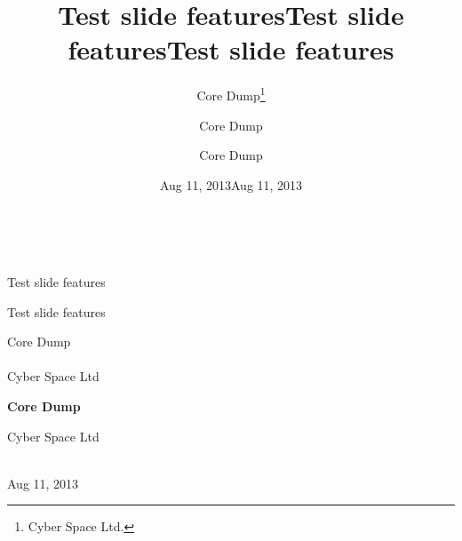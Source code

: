 \documentclass[%
oneside,                 %
final,                   %
chapterprefix=true,      %
open=right               %
10pt]{book}
\begin{document}







\title{Test slide features}


\thispagestyle{empty}
\hbox{\ \ }
\vfill
\begin{center}
{\huge{\bfseries{
\begin{spacing}{1.25}
Test slide features
\end{spacing}
}}}

\title*{Test slide features}

\title{Test slide features}
\begin{center}
{\LARGE\bf
\begin{spacing}{1.25}
Test slide features
\end{spacing}
}
\end{center}

\author{Core Dump\footnote{Cyber Space Ltd.}}

\vspace{1.3cm}

{\Large\textsf{Core Dump}}\\ [3mm]

\ \\ [2mm]

{\large\textsf{Cyber Space Ltd} \\ [1.5mm]}

\author{Core Dump}

\author{Core Dump}

\begin{center}
{\bf Core Dump}
\end{center}

\begin{center}
\centerline{{\small Cyber Space Ltd}}
\end{center}


\date{Aug 11, 2013}
\maketitle
\date{Aug 11, 2013
}

\ \\ [10mm]
{\large\textsf{Aug 11, 2013}}

\end{center}
\end{document}
